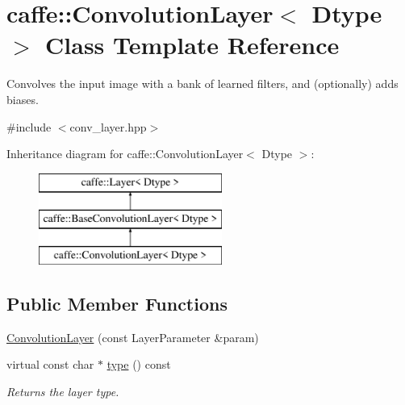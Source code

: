 \hypertarget{classcaffe_1_1ConvolutionLayer}{}\section{caffe\+:\+:Convolution\+Layer$<$ Dtype $>$ Class Template Reference}
\label{classcaffe_1_1ConvolutionLayer}


Convolves the input image with a bank of learned filters, and (optionally) adds biases.  




{\ttfamily \#include $<$conv\+\_\+layer.\+hpp$>$}

Inheritance diagram for caffe\+:\+:Convolution\+Layer$<$ Dtype $>$\+:\begin{figure}[H]
\begin{center}
\leavevmode
\includegraphics[height=3.000000cm]{classcaffe_1_1ConvolutionLayer}
\end{center}
\end{figure}
\subsection*{Public Member Functions}
\begin{DoxyCompactItemize}
\item 
\hyperlink{classcaffe_1_1ConvolutionLayer_ad27360afd7729001b9e4f1d8c8401866}{Convolution\+Layer} (const Layer\+Parameter \&param)
\item 
virtual const char $\ast$ \hyperlink{classcaffe_1_1ConvolutionLayer_afdcf33e7ec63ca5e476ffdc1da1f1fa0}{type} () const \hypertarget{classcaffe_1_1ConvolutionLayer_afdcf33e7ec63ca5e476ffdc1da1f1fa0}{}\label{classcaffe_1_1ConvolutionLayer_afdcf33e7ec63ca5e476ffdc1da1f1fa0}

\begin{DoxyCompactList}\small\item\em Returns the layer type. \end{DoxyCompactList}\end{DoxyCompactItemize}
